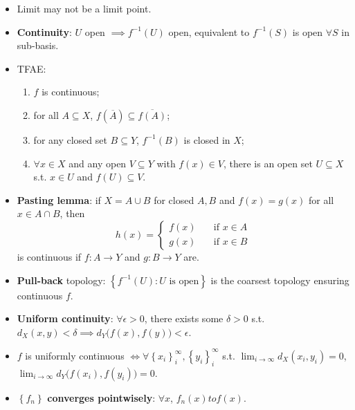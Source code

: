 \documentclass[10pt]{article}
\begin{document}
\begin{multicols*}{3}
\begin{itemize}
            \item Limit may not be a limit point.
            \item \textbf{Continuity}: $U$ open $\implies f^{-1}\left(U\right)$ open, equivalent to $f^{-1}\left(S\right)$ is open $\forall S$ in sub-basis.
            \item TFAE:
            \begin{enumerate}
                \item $f$ is continuous;
                \item for all $A \subseteq X$, $f\left(\overline{A}\right) \subseteq \overline{f\left(A\right)}$;
                \item for any closed set $B \subseteq Y$, $f^{-1}\left(B\right)$ is closed in $X$;
                \item $\forall x \in X$ and any open $V \subseteq Y$ with $f\left(x\right) \in V$, there is an open set $U \subseteq X$ s.t. $x \in U$ and $f\left(U\right) \subseteq V$.
            \end{enumerate}
            \item \textbf{Pasting lemma}: if $X = A \cup B$ for closed $A, B$ and $f\left(x\right) = g\left(x\right)$ for all $x \in A \cap B$, then 
            \begin{equation*}
                h\left(x\right) = \begin{cases}
                    f\left(x\right) & \quad\textrm{if } x \in A \\
                    g\left(x\right) & \quad\textrm{if } x \in B
                \end{cases}
            \end{equation*}
            is continuous if $f \colon A \to Y$ and $g \colon B \to Y$ are.
            \item \textbf{Pull-back} topology: $\left\{f^{-1}\left(U\right) \colon U \textrm{ is open}\right\}$ is the coarsest topology ensuring continuous $f$.
            \item \textbf{Uniform continuity}: $\forall \epsilon > 0$, there exists some $\delta > 0$ s.t. $d_X\left(x, y\right) < \delta \implies d_Y\bigl(f\left(x\right), f\left(y\right)\bigr) < \epsilon$.
            \item $f$ is uniformly continuous $\iff \forall \left\{x_i\right\}_i^{\infty}, \left\{y_i\right\}_{i}^{\infty}$ s.t. $\lim_{i \to \infty}d_X\left(x_i, y_i\right) = 0$, $\lim_{i \to \infty}d_Y\bigl(f\left(x_i\right), f\left(y_i\right)\bigr) = 0$.
            \item $\left\{f_n\right\}$ \textbf{converges pointwisely}: $\forall x$, $f_n\left(x\right) to f\left(x\right)$.

\end{itemize}
\end{multicols*}
\end{document}
